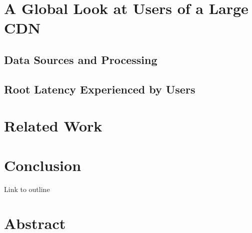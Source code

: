 \documentclass[sigconf,letterpaper,nonacm,10pt]{acmart}
\begin{document}
\hypertarget{a-global-look-at-users-of-a-large-cdn}{%
\section{A Global Look at Users of a Large
CDN}\label{a-global-look-at-users-of-a-large-cdn}}

\hypertarget{data-sources-and-processing}{%
\subsection{Data Sources and
Processing}\label{data-sources-and-processing}}

\hypertarget{root-latency-experienced-by-users}{%
\subsection{Root Latency Experienced by
Users}\label{root-latency-experienced-by-users}}

\hypertarget{related-work}{%
\section{Related Work}\label{related-work}}

\hypertarget{conclusion}{%
\section{Conclusion}\label{conclusion}}

Link to outline \fi

\hypertarget{abstract-1}{%
\section*{Abstract}\label{abstract-1}}
\end{document}
